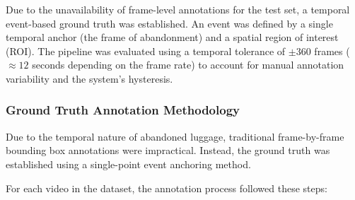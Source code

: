Due to the unavailability of frame-level annotations for the test set, a
temporal event-based ground truth was established. An event was defined by a
single temporal anchor (the frame of abandonment) and a spatial region of
interest (ROI). The pipeline was evaluated using a temporal tolerance of $\pm
	360$ frames ($\approx 12$ seconds depending on the frame rate) to account for
manual annotation variability and the system's hysteresis.

\subsubsection{Ground Truth Annotation Methodology}
\label{sec:ground_truth_annotation_methodology}

Due to the temporal nature of abandoned luggage, traditional frame-by-frame
bounding box annotations were impractical. Instead, the ground truth was
established using a single-point event anchoring method.

For each video in the dataset, the annotation process followed these steps:

